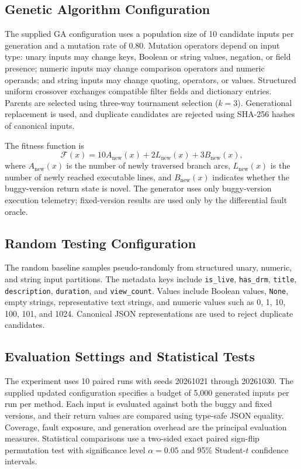 \documentclass[12pt,onecolumn]{IEEEtran}
\begin{document}
\subsection{Genetic Algorithm Configuration}

The supplied GA configuration uses a population size of 10 candidate inputs per generation and a mutation rate of 0.80. Mutation operators depend on input type: unary inputs may change keys, Boolean or string values, negation, or field presence; numeric inputs may change comparison operators and numeric operands; and string inputs may change quoting, operators, or values. Structured uniform crossover exchanges compatible filter fields and dictionary entries. Parents are selected using three-way tournament selection ($k=3$). Generational replacement is used, and duplicate candidates are rejected using SHA-256 hashes of canonical inputs.

The fitness function is
\begin{equation}
\mathcal{F}(x)=10A_{\mathrm{new}}(x)
+2L_{\mathrm{new}}(x)
+3B_{\mathrm{new}}(x),
\end{equation}
where $A_{\mathrm{new}}(x)$ is the number of newly traversed branch arcs, $L_{\mathrm{new}}(x)$ is the number of newly reached executable lines, and $B_{\mathrm{new}}(x)$ indicates whether the buggy-version return state is novel. The generator uses only buggy-version execution telemetry; fixed-version results are used only by the differential fault oracle.

\subsection{Random Testing Configuration}

The random baseline samples pseudo-randomly from structured unary, numeric, and string input partitions. The metadata keys include \texttt{is\_live}, \texttt{has\_drm}, \texttt{title}, \texttt{description}, \texttt{duration}, and \texttt{view\_count}. Values include Boolean values, \texttt{None}, empty strings, representative text strings, and numeric values such as 0, 1, 10, 100, 101, and 1024. Canonical JSON representations are used to reject duplicate candidates.

\subsection{Evaluation Settings and Statistical Tests}

The experiment uses 10 paired runs with seeds 20261021 through 20261030. The supplied updated configuration specifies a budget of 5,000 generated inputs per run per method. Each input is evaluated against both the buggy and fixed versions, and their return values are compared using type-safe JSON equality. Coverage, fault exposure, and generation overhead are the principal evaluation measures. Statistical comparisons use a two-sided exact paired sign-flip permutation test with significance level $\alpha=0.05$ and 95\% Student-$t$ confidence intervals.
\end{document}
